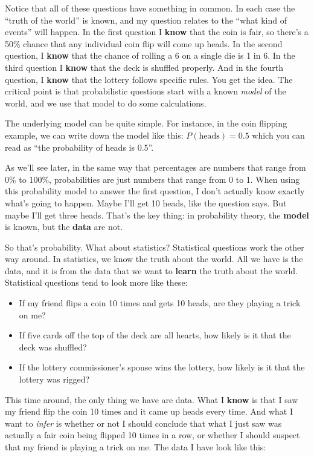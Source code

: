 \documentclass[]{book}
\begin{document}
Notice that all of these questions have something in common. In each case the ``truth of the world'' is known, and my question relates to the ``what kind of events'' will happen. In the first question I \textbf{know} that the coin is fair, so there's a 50\% chance that any individual coin flip will come up heads. In the second question, I \textbf{know} that the chance of rolling a 6 on a single die is 1 in 6. In the third question I \textbf{know} that the deck is shuffled properly. And in the fourth question, I \textbf{know} that the lottery follows specific rules. You get the idea. The critical point is that probabilistic questions start with a known \emph{model} of the world, and we use that model to do some calculations.

The underlying model can be quite simple. For instance, in the coin flipping example, we can write down the model like this: \(P(\mbox{heads}) = 0.5\) which you can read as ``the probability of heads is 0.5''.

As we'll see later, in the same way that percentages are numbers that range from 0\% to 100\%, probabilities are just numbers that range from 0 to 1. When using this probability model to answer the first question, I don't actually know exactly what's going to happen. Maybe I'll get 10 heads, like the question says. But maybe I'll get three heads. That's the key thing: in probability theory, the \textbf{model} is known, but the \textbf{data} are not.

So that's probability. What about statistics? Statistical questions work the other way around. In statistics, we know the truth about the world. All we have is the data, and it is from the data that we want to \textbf{learn} the truth about the world. Statistical questions tend to look more like these:

\begin{itemize}
\item
  If my friend flips a coin 10 times and gets 10 heads, are they playing a trick on me?
\item
  If five cards off the top of the deck are all hearts, how likely is it that the deck was shuffled?
\item
  If the lottery commissioner's spouse wins the lottery, how likely is it that the lottery was rigged?
\end{itemize}

This time around, the only thing we have are data. What I \textbf{know} is that I saw my friend flip the coin 10 times and it came up heads every time. And what I want to \emph{infer} is whether or not I should conclude that what I just saw was actually a fair coin being flipped 10 times in a row, or whether I should suspect that my friend is playing a trick on me. The data I have look like this:
\end{document}
